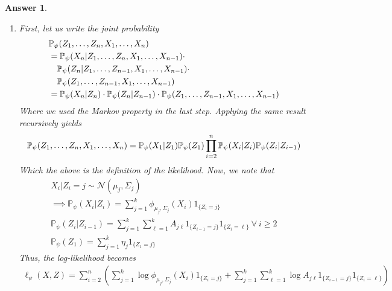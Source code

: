 \documentclass[12pt]{article}
\theoremstyle{colon}
\newtheorem*{answer}{Answer}
\begin{document}
\clearpage

\begin{answer}
  \leavevmode
  \begin{enumerate}[label=\arabic*)]
    \item First, let us write the joint probability
      \begin{align*}
        & \mathbb{P}_{\psi} (Z_1, \mathellipsis, Z_n, X_1, \mathellipsis, X_n) \\
        &= \mathbb{P}_{\psi} (X_n | Z_1, \mathellipsis, Z_n, X_1, \mathellipsis, X_{n-1}) \cdot \\
        &\quad \mathbb{P}_{\psi} (Z_n | Z_1, \mathellipsis, Z_{n-1}, X_1, \mathellipsis, X_{n-1}) \cdot \\
        &\quad \mathbb{P}_{\psi} (Z_1, \mathellipsis, Z_{n-1}, X_1, \mathellipsis, X_{n-1}) \\
        &= \mathbb{P}_{\psi} (X_n | Z_n) \cdot \mathbb{P}_{\psi} (Z_n | Z_{n-1}) \cdot \mathbb{P}_{\psi} (Z_1, \mathellipsis, Z_{n-1}, X_1, \mathellipsis, X_{n-1})
      \end{align*}
      Where we used the Markov property in the last step. Applying the same result recursively yields
      \begin{gather*}
        \mathbb{P}_{\psi} (Z_1, \mathellipsis, Z_n, X_1, \mathellipsis, X_n) = \mathbb{P}_{\psi} (X_1 | Z_1) \mathbb{P}_{\psi} (Z_1) \prod_{i=2}^n \mathbb{P}_{\psi} (X_i | Z_i) \mathbb{P}_{\psi} (Z_i | Z_{i-1})
      \end{gather*}
      Which the above is the definition of the likelihood. Now, we note that
      \begin{gather*}
        X_i | Z_i = j \sim \mathcal{N}(\mu_j, \Sigma_j) \\
        \implies \mathbb{P}_{\psi} (X_i | Z_i) = \sum_{j=1}^k \phi_{\mu_j, \Sigma_j}(X_i) 1_{\{ Z_i = j \}} \\
        \mathbb{P}_{\psi} (Z_i | Z_{i-1}) = \sum_{j=1}^k \sum_{\ell=1}^k A_{j \ell} 1_{\{Z_{i-1} = j\}} 1_{\{Z_i = \ell\}} \ \forall \ i \geq 2 \\
        \mathbb{P}_{\psi} (Z_1) = \sum_{j=1}^k \eta_j 1_{\{Z_1 = j\}}
      \end{gather*}
      Thus, the log-likelihood becomes
      \begin{gather*}
        \ell_{\psi}(X,Z) = \sum_{i=2}^n \left( \sum_{j=1}^k \log \phi_{\mu_j, \Sigma_j}(X_i) 1_{\{ Z_i = j \}} + \sum_{j=1}^k \sum_{\ell=1}^k \log A_{j \ell} 1_{\{Z_{i-1} = j\}} 1_{\{Z_i = \ell\}} \right) \\

\end{gather*}
\end{enumerate}
\end{answer}
\end{document}
